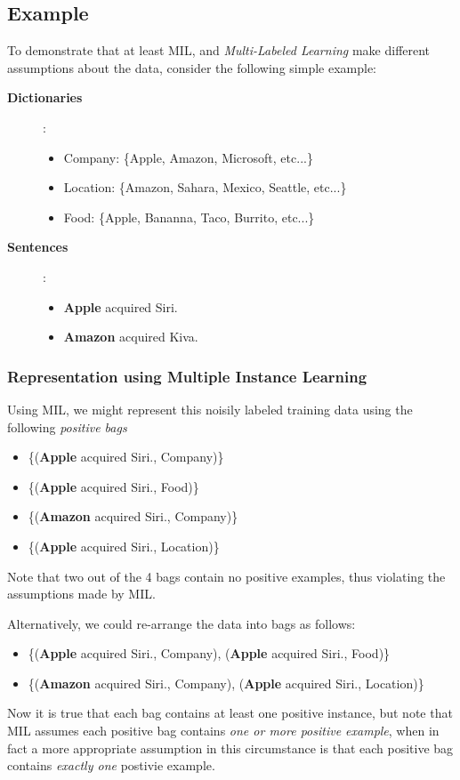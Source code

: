 \documentclass[12pt]{article}
\begin{document}
\subsection{Example}
To demonstrate that at least MIL, and \emph{Multi-Labeled Learning} make different assumptions about the data, consider the following simple example:
\begin{description}
  \item[\bf Dictionaries]:
    \begin{itemize}
      \item {\sc Company}: \{Apple, Amazon, Microsoft, etc...\}
      \item {\sc Location}: \{Amazon, Sahara, Mexico, Seattle, etc...\}
      \item {\sc Food}: \{Apple, Bananna, Taco, Burrito, etc...\}
    \end{itemize}
  \item[\bf Sentences]:
    \begin{itemize}
      \item {\bf Apple} acquired Siri.
      \item {\bf Amazon} acquired Kiva.
    \end{itemize}
\end{description}

\subsubsection{Representation using Multiple Instance Learning}
Using MIL, we might represent this noisily labeled training data using the following \emph{positive bags}
\begin{itemize}
  \item \{({\bf Apple} acquired Siri., {\sc Company})\}
  \item \{({\bf Apple} acquired Siri., {\sc Food})\}
  \item \{({\bf Amazon} acquired Siri., {\sc Company})\}
  \item \{({\bf Apple} acquired Siri., {\sc Location})\}
\end{itemize}
Note that two out of the 4 bags contain no positive examples, thus violating the assumptions made by MIL.

Alternatively, we could re-arrange the data into bags as follows:
\begin{itemize}
  \item \{({\bf Apple} acquired Siri., {\sc Company}),
    ({\bf Apple} acquired Siri., {\sc Food})\}
  \item \{({\bf Amazon} acquired Siri., {\sc Company}),
    ({\bf Apple} acquired Siri., {\sc Location})\}
\end{itemize}
Now it is true that each bag contains at least one positive instance, but note that MIL assumes each positive
bag contains \emph{one or more positive example}, when in fact a more appropriate assumption
in this circumstance is that each positive bag contains \emph{exactly one} postivie example.
\end{document}
